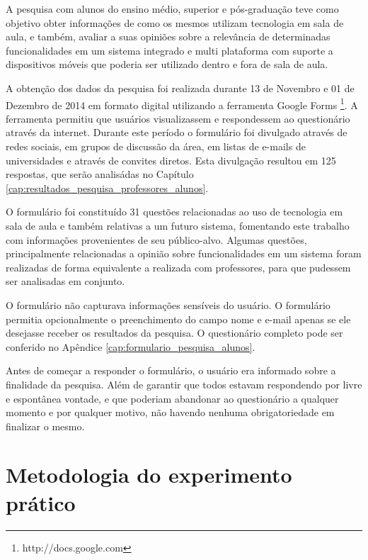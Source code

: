 A pesquisa com alunos do ensino médio, superior e pós-graduação teve como objetivo obter informações de como os mesmos utilizam tecnologia em sala de aula, e também, avaliar a suas opiniões sobre a relevância de determinadas funcionalidades em um sistema integrado e multi plataforma com suporte a dispositivos móveis que poderia ser utilizado dentro e fora de sala de aula.

A obtenção dos dados da pesquisa foi realizada durante 13 de Novembro e 01 de Dezembro de 2014 em formato digital utilizando a ferramenta Google Forms \footnote{http://docs.google.com}. A ferramenta permitiu que usuários visualizassem e respondessem ao questionário através da internet. Durante este período o formulário foi divulgado através de redes sociais, em grupos de discussão da área, em listas de e-mails de universidades e através de convites diretos. Esta divulgação resultou em 125 respostas, que serão analisádas no Capítulo \ref{cap:resultados_pesquisa_professores_alunos}.

O formulário foi constituído 31 questões relacionadas ao uso de tecnologia em sala de aula e também relativas a um futuro sistema, fomentando este trabalho com informações provenientes de seu público-alvo. Algumas questões, principalmente relacionadas a opinião sobre funcionalidades em um sistema foram realizadas de forma equivalente a realizada com professores, para que pudessem ser analisadas em conjunto.

O formulário não capturava informações sensíveis do usuário. O formulário permitia opcionalmente o preenchimento do campo nome e e-mail apenas se ele desejasse receber os resultados da pesquisa. O questionário completo pode ser conferido no Apêndice \ref{cap:formulario_pesquisa_alunos}.

Antes de começar a responder o formulário, o usuário era informado sobre a finalidade da pesquisa. Além de garantir que todos estavam respondendo por livre e espontânea vontade, e que poderiam abandonar ao questionário a qualquer momento e por qualquer motivo, não havendo nenhuma obrigatoriedade em finalizar o mesmo.


\section{Metodologia do experimento prático}
\label{sec:metodologia_experimento}


